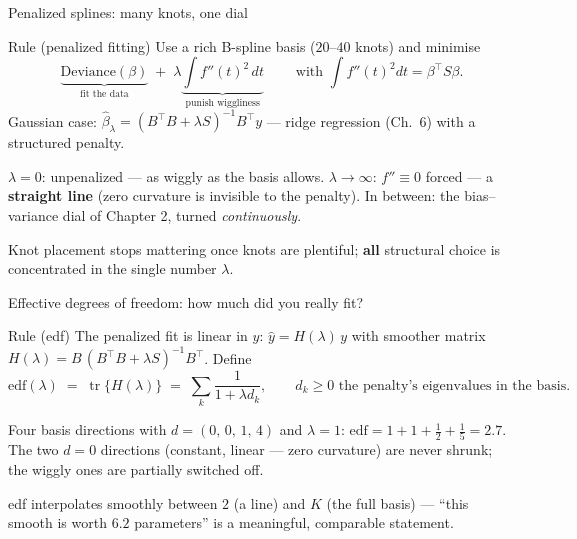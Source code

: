 \documentclass[aspectratio=169,11pt]{beamer}
\begin{document}
\begin{frame}{Penalized splines: many knots, one dial}
  \footnotesize
  \begin{block}{Rule (penalized fitting)}
    \footnotesize
    Use a rich B-spline basis ($20$--$40$ knots) and minimise
    \[
      \boxed{\;\underbrace{\text{Deviance}(\beta)}_{\text{fit the data}}
      \;+\; \lambda \underbrace{\int f''(t)^2\, dt}_{\text{punish wiggliness}}\;}
      \qquad\text{with } \int f''(t)^2 dt = \beta^{\top} S \beta .
    \]
    Gaussian case: $\hat\beta_\lambda = (B^{\top}B + \lambda S)^{-1} B^{\top} y$ ---
    ridge regression (Ch.\ 6) with a structured penalty.
  \end{block}
  \begin{readme}
    $\lambda = 0$: unpenalized --- as wiggly as the basis allows.
    \;$\lambda \to \infty$: $f''\equiv 0$ forced --- a \textbf{straight line} (zero
    curvature is invisible to the penalty).
    \;In between: the bias--variance dial of Chapter 2, turned \emph{continuously}.
  \end{readme}
  \begin{takeaway}
    Knot placement stops mattering once knots are plentiful; \textbf{all} structural
    choice is concentrated in the single number $\lambda$.
  \end{takeaway}
\end{frame}

\begin{frame}{Effective degrees of freedom: how much did you really fit?}
  \footnotesize
  \begin{block}{Rule (edf)}
    \footnotesize
    The penalized fit is linear in $y$: $\hat y = H(\lambda)\, y$ with smoother matrix
    $H(\lambda) = B\,(B^{\top}B + \lambda S)^{-1} B^{\top}$. Define
    \[
      \text{edf}(\lambda) \;=\; \operatorname{tr}\{H(\lambda)\}
      \;=\; \sum_{k} \frac{1}{1 + \lambda d_k},
      \qquad d_k \ge 0 \text{ the penalty's eigenvalues in the basis.}
    \]
  \end{block}
  \begin{numexample}
    Four basis directions with $d = (0,\, 0,\, 1,\, 4)$ and $\lambda = 1$:
    $\text{edf} = 1 + 1 + \tfrac{1}{2} + \tfrac{1}{5} = \mathbf{2.7}$. The two $d=0$
    directions (constant, linear --- zero curvature) are never shrunk; the wiggly ones
    are partially switched off.
  \end{numexample}
  \begin{takeaway}
    edf interpolates smoothly between $2$ (a line) and $K$ (the full basis) --- ``this
    smooth is worth $6.2$ parameters'' is a meaningful, comparable statement.
  \end{takeaway}
\end{frame}
\end{document}
